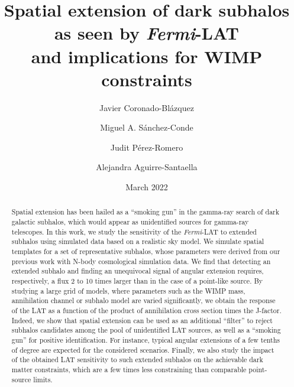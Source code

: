 \documentclass[%
 reprint,
nofootinbib,
 amsmath,amssymb,
 aps,
]{revtex4-2}
\begin{document}
\title{Spatial extension of dark subhalos as seen by \textit{Fermi}-LAT\\ and implications for WIMP constraints}

\author{Javier Coronado-Bl\'azquez}
\author{Miguel A. S\'anchez-Conde}
\author{Judit P\'erez-Romero}


\author{Alejandra Aguirre-Santaella}

\date{March 2022}%

\begin{abstract}
Spatial extension has been hailed as a ``smoking gun'' in the gamma-ray search of dark galactic subhalos, which would appear as unidentified sources for gamma-ray telescopes. {  In this work, we study the sensitivity} of the \textit{Fermi}-LAT to extended subhalos using simulated data based on a realistic sky model. We simulate spatial templates for a set of representative subhalos, whose parameters were derived from our previous work with N-body cosmological simulation data. We find that detecting an extended subhalo and finding an unequivocal signal of angular extension requires, respectively, a flux 2 to 10 times larger than in the case of a point-like source. By studying a large grid of models, where parameters such as the WIMP mass, annihilation channel or subhalo model are varied significantly, we obtain the response of the LAT as a function of the product of annihilation cross section times the J-factor. Indeed, we show that spatial extension can be used as an additional “filter” to reject subhalos candidates among the pool of unidentified LAT sources, as well as a ``smoking gun'' for positive identification. {For instance, typical angular extensions of a few tenths of degree are expected for the considered scenarios.} Finally, we also study the impact of the obtained LAT sensitivity to such extended subhalos on the achievable dark matter constraints, which are a few times less constraining than comparable point-source limits.
\end{abstract}
\end{document}
